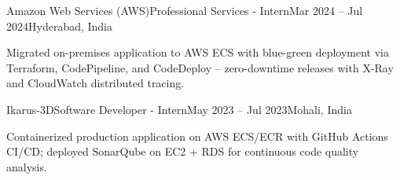 \resumeExp
{Amazon Web Services (AWS)}{Professional Services - Intern}{Mar 2024 -- Jul 2024}{Hyderabad, India}
\resumeItemListStart
    \item[$\diamond$] Migrated on-premises application to AWS ECS with blue-green deployment via Terraform, CodePipeline, and CodeDeploy -- zero-downtime releases with X-Ray and CloudWatch distributed tracing.
\resumeItemListEnd

\resumeExp
{Ikarus-3D}{Software Developer - Intern}{May 2023 -- Jul 2023}{Mohali, India}
\resumeItemListStart
    \item[$\diamond$] Containerized production application on AWS ECS/ECR with GitHub Actions CI/CD; deployed SonarQube on EC2 + RDS for continuous code quality analysis.
\resumeItemListEnd

\resumeSubHeadingListEnd
